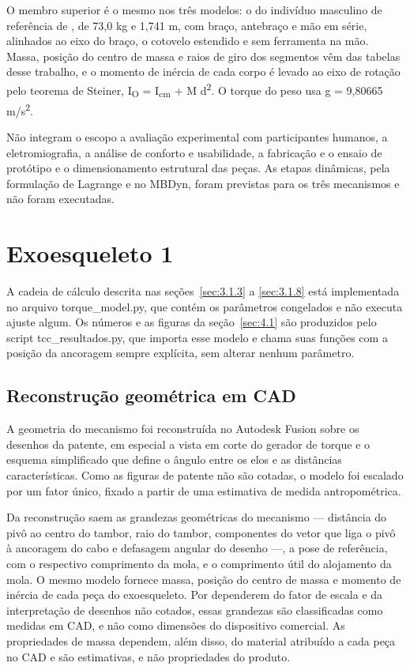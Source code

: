 O membro superior é o mesmo nos três modelos: o do indivíduo masculino de referência de \textcite{deleva1996}, de 73,0 kg e 1,741 m, com braço, antebraço e mão em série, alinhados ao eixo do braço, o cotovelo estendido e sem ferramenta na mão. Massa, posição do centro de massa e raios de giro dos segmentos vêm das tabelas desse trabalho, e o momento de inércia de cada corpo é levado ao eixo de rotação pelo teorema de Steiner, I\textsubscript{O} = I\textsubscript{cm} + M d\textsuperscript{2}. O torque do peso usa g = 9,80665 m/s\textsuperscript{2}.

Não integram o escopo a avaliação experimental com participantes humanos, a eletromiografia, a análise de conforto e usabilidade, a fabricação e o ensaio de protótipo e o dimensionamento estrutural das peças. As etapas dinâmicas, pela formulação de Lagrange e no MBDyn, foram previstas para os três mecanismos e não foram executadas.

\section{Exoesqueleto 1}\label{sec:3.1}

A cadeia de cálculo descrita nas seções~\ref{sec:3.1.3} a \ref{sec:3.1.8} está implementada no arquivo torque\_model.py, que contém os parâmetros congelados e não executa ajuste algum. Os números e as figuras da seção~\ref{sec:4.1} são produzidos pelo script tcc\_resultados.py, que importa esse modelo e chama suas funções com a posição da ancoragem sempre explícita, sem alterar nenhum parâmetro.

\subsection{Reconstrução geométrica em CAD}\label{sec:3.1.1}

A geometria do mecanismo foi reconstruída no Autodesk Fusion sobre os desenhos da patente, em especial a vista em corte do gerador de torque e o esquema simplificado que define o ângulo entre os elos e as distâncias características. Como as figuras de patente não são cotadas, o modelo foi escalado por um fator único, fixado a partir de uma estimativa de medida antropométrica.

Da reconstrução saem as grandezas geométricas do mecanismo — distância do pivô ao centro do tambor, raio do tambor, componentes do vetor que liga o pivô à ancoragem do cabo e defasagem angular do desenho —, a pose de referência, com o respectivo comprimento da mola, e o comprimento útil do alojamento da mola. O mesmo modelo fornece massa, posição do centro de massa e momento de inércia de cada peça do exoesqueleto. Por dependerem do fator de escala e da interpretação de desenhos não cotados, essas grandezas são classificadas como medidas em CAD, e não como dimensões do dispositivo comercial. As propriedades de massa dependem, além disso, do material atribuído a cada peça no CAD e são estimativas, e não propriedades do produto.

